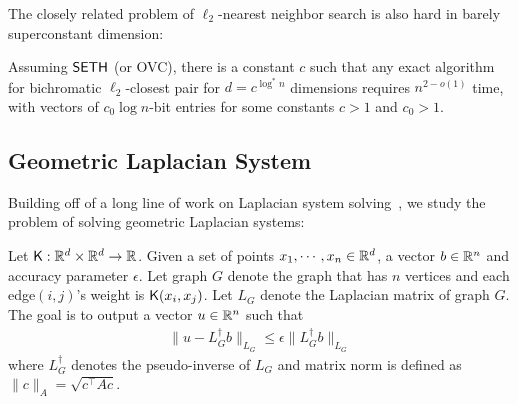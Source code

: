The closely related problem of $\ell_2$-nearest neighbor search is also hard in barely superconstant dimension:

\begin{theorem}\label{thm:lownnhard}
Assuming ${\sf SETH}$ (or {\sf OVC}), there is a constant $c$ such that any exact algorithm for bichromatic $\ell_2$-closest pair for $d = c^{\log^* n}$ dimensions requires $n^{2-o(1)}$ time, with vectors of $c_0\log n$-bit entries for some constants $c > 1$ and $c_0 > 1$.
\end{theorem}


\subsection{Geometric Laplacian System}

Building off of a long line of work on Laplacian system solving~\cite{st04,kmp10,kmp11,kosz13,ckmpprx14}, we study the problem of solving geometric Laplacian systems:
\begin{problem}\label{pro:geometric_Laplacian_system}
Let $\mathsf{K} : {\mathbb R}^d \times {\mathbb R}^d \rightarrow {\mathbb R}$. Given a set of points $x_1, \cdots, x_n \in {\mathbb R}^d$, a vector $ b\in {\mathbb R}^n$ and accuracy parameter $\epsilon$. Let graph $G$ denote the graph that has $n$ vertices and each edge$(i,j)$'s weight is $\mathsf{K}(x_i,x_j)$. Let $L_G$ denote the Laplacian matrix of graph $G$. The goal is to output a vector $u \in {\mathbb R}^n$ such that
\begin{align*}
\| u - L_G^\dagger b \|_{L_G} \leq \epsilon \| L_G^\dagger b \|_{L_G} 
\end{align*}
where $L_G^\dagger$ denotes the pseudo-inverse of $L_G$ and matrix norm is defined as $\| c \|_A = \sqrt{ c^\top A c }$.
\end{problem}

